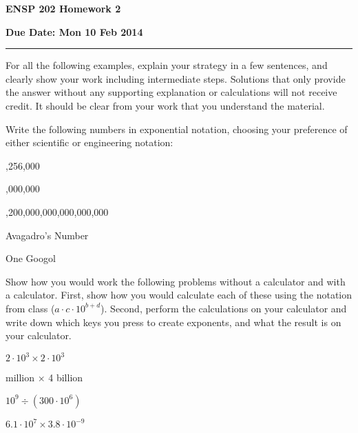 \documentclass{article}
\newcommand{\chead}[1]
{\begin{center}\large\textbf{#1}\end{center}}
\begin{document}
\chead{ENSP 202 Homework 2}
\chead{Due Date:  Mon 10 Feb 2014}
\hrule
\vspace{10pt}



For all the following examples, explain your strategy in a few
sentences, and clearly show your work including intermediate steps.
Solutions that only provide the answer without any supporting
explanation or calculations will not receive credit.  It should be
clear from your work that you understand the material.

Write the following numbers in exponential notation, choosing your
preference of either scientific or engineering notation:

 

,256,000 


 

,000,000 


,200,000,000,000,000,000 


\subproblem Avagadro's Number 

\subproblem One Googol 



Show how you would work the following problems without a calculator and
with a calculator.  First, show how you would calculate each of these
using the notation from class ($a \cdot c \cdot 10^{b+d}$).  Second,
perform the calculations on your calculator and write down which keys
you press to create exponents, and what the result is on your
calculator.

\subproblem $2 \cdot 10^3 \times 2 \cdot 10^3$ 

 million $\times$ 4 billion 


\subproblem $10^9 \div (300 \cdot 10^6)$ 

\subproblem $ 6.1 \cdot 10^7 \times 3.8 \cdot 10^{-9} $
\end{document}
